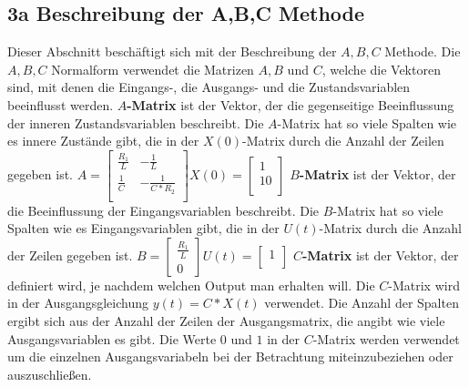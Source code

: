 \documentclass[11pt, a4paper, twoside]{article}   	%
\begin{document}
\subsection{3a Beschreibung der A,B,C Methode}
Dieser Abschnitt beschäftigt sich mit der Beschreibung der $A, B, C$ Methode.
\newline
\newline
Die $A, B, C$ Normalform verwendet die Matrizen $A, B$ und $C$, welche die Vektoren sind, mit denen die Eingangs-, die Ausgangs- und die Zustandsvariablen beeinflusst werden. 
\newline
\newline
\textbf{$A$-Matrix} ist der Vektor, der die gegenseitige Beeinflussung der inneren Zustandsvariablen beschreibt. Die $A$-Matrix hat so viele Spalten wie es innere Zustände gibt, die in der $X(0)$-Matrix durch die Anzahl der Zeilen gegeben ist.
\newline
\newline
$
A = \begin{bmatrix}
	\frac{R_{1}}{L} & -\frac{1}{L} \\[0.3em]
    \frac{1}{C}     & -\frac{1}{C*R_{2}} \\[0.3em]
\end{bmatrix}
X(0) =
\begin{bmatrix}
	1  \\[0.3em]
    10 \\[0.3em]
\end{bmatrix} 
$
\newline
\newline
\newline
\textbf{$B$-Matrix} ist der Vektor, der die Beeinflussung der Eingangsvariablen beschreibt. Die $B$-Matrix hat so viele Spalten wie es Eingangsvariablen gibt, die in der $U(t)$-Matrix durch die Anzahl der Zeilen gegeben ist.
\newline
\newline
$
B = \begin{bmatrix}
	\frac{R_{1}}{L} \\[0.3em]
	0
\end{bmatrix}
U(t) =
\begin{bmatrix}
	1  \\[0.3em]
\end{bmatrix} 
$
\newline
\newline
\newline
\textbf{$C$-Matrix} ist der Vektor, der definiert wird, je nachdem welchen Output man erhalten will. Die $C$-Matrix wird in der Ausgangsgleichung $y(t) = C * X(t)$ verwendet. Die Anzahl der Spalten ergibt sich aus der Anzahl der Zeilen der Ausgangsmatrix, die angibt wie viele Ausgangsvariablen es gibt. Die Werte $0$ und $1$ in der $C$-Matrix werden verwendet um die einzelnen Ausgangsvariabeln bei der Betrachtung miteinzubeziehen oder auszuschließen.
\end{document}

